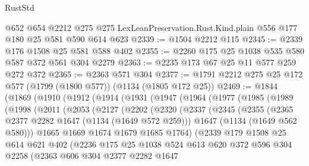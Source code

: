 \begin{lexlean}{RustStd}
\begin{coremodule}
{\begin{coremodule}
{{{{{{{    @652
    @654
    @2212
    @275
    @275
    LexLeanPreservation.Rust.Kind.plain
    @556
    @177
    @180
    @25
    @581
    @590
    @614
    @623
@2339 := @1504 @2212 @115
@2345 := @2339 @176 @1508 @25 @581 @588 @402
@2355 := @2260 @175 @25 @1038 @535 @580 @587 @372 @561 @304 @2279
@2363 := @2235 @173 @67 @25 @11 @577 @259 @272 @372
@2365 := @2363 @571 @304
@2377 := @1791 @2212 @275 @25 @172 @577 (@1799 (@1800 @577)) (@1134 (@1805 @172 @25))
@2469 := @1844
    (@1869
      (@1910
        (@1912
          (@1914
            (@1931
              (@1947
                (@1964
                  (@1977
                    (@1985
                      (@1989
                        (@1998
                          (@2011
                            (@2053
                              (@2127
                                (@2202
                                  (@2320
                                    (@2337
                                      (@2345
                                        (@2355
                                          (@2365 @2377 @2282 @1647 (@1134 (@1649 @572 @259)))
                                          @1647
                                          (@1134 (@1649 @562 @580)))
                                        @1665
                                        @1669
                                        @1674
                                        @1679
                                        @1685
                                        @1764)
                                      (@2339
                                        @179
                                        @1508
                                        @25
                                        @614
                                        @621
                                        @402
                                        (@2236
                                          @175
                                          @25
                                          @1038
                                          @524
                                          @613
                                          @620
                                          @372
                                          @596
                                          @304
                                          @2258
                                          (@2363
                                            @606
                                            @304
                                            @2377
                                            @2282
                                            @1647
}}}}}}}
\end{coremodule}}
\end{coremodule}
\end{lexlean}
